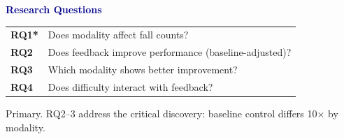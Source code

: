 \documentclass{beamer}
\begin{document}
\begin{frame}[plain]
  \vspace{0.8cm}
  \centering

  \textcolor{darkblue}{\Large \textbf{Research Questions}}

  \vspace{0.6cm}

  \begin{tabular}{p{1.2cm} p{7.8cm}}
    \textbf{RQ1*} & Does modality affect fall counts? \\[0.3cm]
    \textbf{RQ2} & Does feedback improve performance (baseline-adjusted)? \\[0.3cm]
    \textbf{RQ3} & Which modality shows better improvement? \\[0.3cm]
    \textbf{RQ4} & Does difficulty interact with feedback? \\
  \end{tabular}

  \vspace{0.7cm}


  \vspace{0.5cm}

  {\tiny *Primary. RQ2–3 address the critical discovery: baseline control differs 10× by modality.}
\end{frame}
\end{document}
